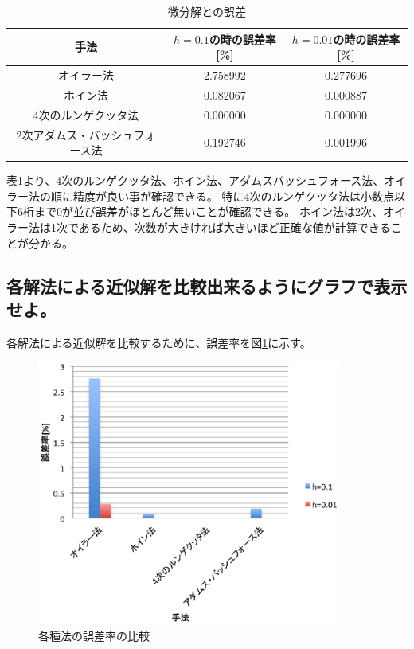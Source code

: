 \documentclass[]{jsarticle}
\begin{document}
\begin{table}[htbp]
\begin{center}
\caption{微分解との誤差}
\begin{tabular}{|c|c|c|} \hline
手法 & $h=0.1$の時の誤差率[\%] & $h=0.01$の時の誤差率[\%] \\ \hline
オイラー法 & 2.758992 & 0.277696 \\ \hline
ホイン法& 0.082067 & 0.000887 \\ \hline
4次のルンゲクッタ法 & 0.000000 & 0.000000 \\ \hline
2次アダムス・バッシュフォース法 & 0.192746 & 0.001996 \\ \hline
\end{tabular}
\label{error}
\end{center}
\end{table}

表\ref{error}より、4次のルンゲクッタ法、ホイン法、アダムスバッシュフォース法、オイラー法の順に精度が良い事が確認できる。
特に4次のルンゲクッタ法は小数点以下6桁まで0が並び誤差がほとんど無いことが確認できる。
ホイン法は2次、オイラー法は1次であるため、次数が大きければ大きいほど正確な値が計算できることが分かる。

\subsection{各解法による近似解を比較出来るようにグラフで表示せよ。}

各解法による近似解を比較するために、誤差率を図\ref{fig:error-comparison}に示す。

\begin{figure}
\centering
\includegraphics[width=100mm]{./img/error-comparison.eps}
\caption{各種法の誤差率の比較}
\label{fig:error-comparison}
\end{figure}
\end{document}
